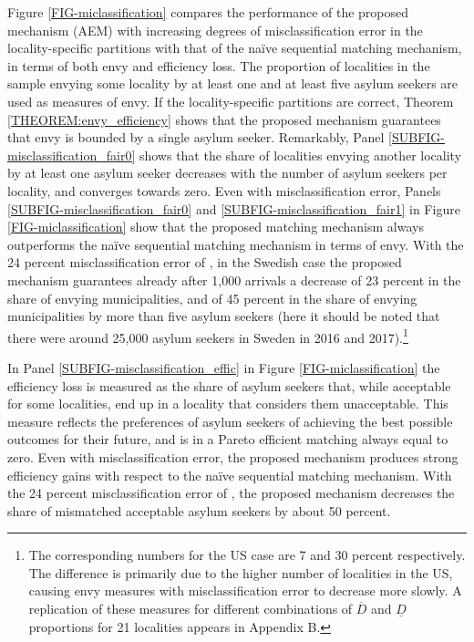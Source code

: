 \documentclass[12pt,fleqn]{article}
\begin{document}
Figure \ref{FIG-miclassification} compares the performance of the proposed mechanism (AEM) with increasing degrees of misclassification error in the locality-specific partitions with that of the na\"{i}ve sequential matching mechanism, in terms of both envy and efficiency loss. The proportion of localities in the sample envying some locality by at least one and at least five asylum seekers are used as measures of envy. If the locality-specific partitions are correct, Theorem \ref{THEOREM:envy_efficiency} shows that the proposed mechanism guarantees that envy is bounded by a single asylum seeker. Remarkably, Panel \ref{SUBFIG-misclassification_fair0} shows that the share of localities envying another locality by at least one asylum seeker decreases with the number of asylum seekers per locality, and converges towards zero. Even with misclassification error, Panels \ref{SUBFIG-misclassification_fair0} and \ref{SUBFIG-misclassification_fair1} in Figure \ref{FIG-miclassification} show that the proposed matching mechanism always outperforms the na\"{i}ve sequential matching mechanism in terms of envy. With the 24 percent misclassification error of \cite{bib:BansakEtAl}, in the Swedish case the proposed mechanism guarantees already after 1,000 arrivals a decrease of 23 percent in the share of envying municipalities, and of 45 percent in the share of envying municipalities by more than five asylum seekers (here it should be noted that there were around 25,000 asylum seekers in Sweden in 2016 and 2017).\footnote{The corresponding numbers for the US case are 7 and 30 percent respectively. The difference is primarily due to the higher number of localities in the US, causing envy measures with misclassification error to decrease more slowly. A replication of these measures for different combinations of $\overline{D}$ and $\underline{D}$ proportions for 21 localities appears in Appendix B.}

In Panel \ref{SUBFIG-misclassification_effic} in Figure \ref{FIG-miclassification}
the efficiency loss is measured as the share of asylum seekers that, while acceptable for some localities, end up in a locality that considers them unacceptable. This measure reflects the preferences of asylum seekers of achieving the best possible outcomes for their future, and is in a Pareto efficient matching always equal to zero. Even with misclassification error, the proposed mechanism produces strong efficiency gains with respect to the na\"{i}ve sequential matching mechanism. With the 24 percent misclassification error of \cite{bib:BansakEtAl}, the proposed mechanism decreases the share of mismatched acceptable asylum seekers by about 50 percent.
\end{document}
